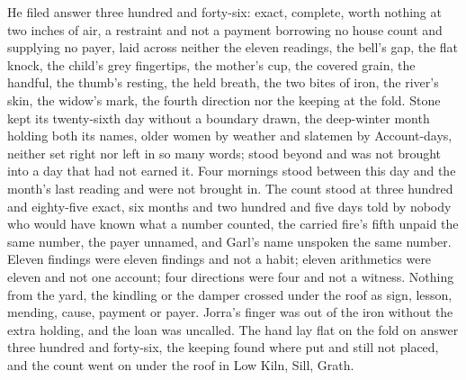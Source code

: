 He filed answer three hundred and forty-six: exact, complete, worth nothing at two inches of air, a restraint and not a payment borrowing no house count and supplying no payer, laid across neither the eleven readings, the bell's gap, the flat knock, the child's grey fingertips, the mother's cup, the covered grain, the handful, the thumb's resting, the held breath, the two bites of iron, the river's skin, the widow's mark, the fourth direction nor the keeping at the fold. Stone kept its twenty-sixth day without a boundary drawn, the deep-winter month holding both its names, older women by weather and slatemen by  Account-days, neither set right nor left in so many words;  stood beyond and was not brought into a day that had not earned it. Four mornings stood between this day and the month's last reading and were not brought in. The count stood at three hundred and eighty-five exact, six months and two hundred and five days told by nobody who would have known what a number counted, the carried fire's fifth unpaid the same number, the payer unnamed, and Garl's name unspoken the same number. Eleven findings were eleven findings and not a habit; eleven arithmetics were eleven and not one account; four directions were four and not a witness. Nothing from the yard, the kindling or the damper crossed under the roof as sign, lesson, mending, cause, payment or payer. Jorra's finger was out of the iron without the extra holding, and the loan was uncalled. The hand lay flat on the fold on answer three hundred and forty-six, the keeping found where put and still not placed, and the count went on under the roof in Low Kiln, Sill, Grath.
